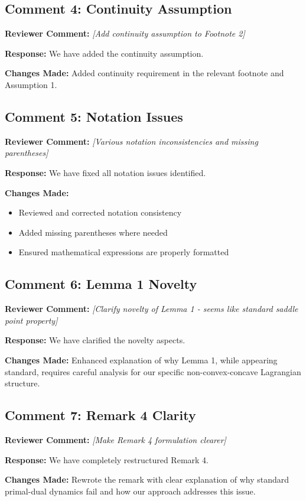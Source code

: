\documentclass[11pt]{article}
\newcommand{\reviewercomment}[1]{\textbf{Reviewer Comment:} \textit{#1}}
\newcommand{\response}[1]{\textbf{Response:} #1}
\newcommand{\changes}[1]{\textbf{Changes Made:} #1}
\begin{document}
\subsection*{Comment 4: Continuity Assumption}

\reviewercomment{[Add continuity assumption to Footnote 2]}

\response{We have added the continuity assumption.}

\changes{Added continuity requirement in the relevant footnote and Assumption 1.}

\subsection*{Comment 5: Notation Issues}

\reviewercomment{[Various notation inconsistencies and missing parentheses]}

\response{We have fixed all notation issues identified.}

\changes{
\begin{itemize}
\item Reviewed and corrected notation consistency
\item Added missing parentheses where needed
\item Ensured mathematical expressions are properly formatted
\end{itemize}
}

\subsection*{Comment 6: Lemma 1 Novelty}

\reviewercomment{[Clarify novelty of Lemma 1 - seems like standard saddle point property]}

\response{We have clarified the novelty aspects.}

\changes{Enhanced explanation of why Lemma 1, while appearing standard, requires careful analysis for our specific non-convex-concave Lagrangian structure.}

\subsection*{Comment 7: Remark 4 Clarity}

\reviewercomment{[Make Remark 4 formulation clearer]}

\response{We have completely restructured Remark 4.}

\changes{Rewrote the remark with clear explanation of why standard primal-dual dynamics fail and how our approach addresses this issue.}
\end{document}
